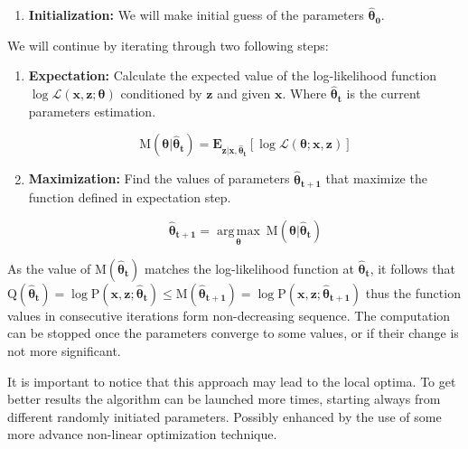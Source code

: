 \documentclass[thesis=M,english]{FITthesis}[2012/10/20]
\newcommand{\matr}[1]{\mathbf{#1}}
\begin{document}
\begin{enumerate}
\item \textbf{Initialization:} We will make initial guess of the parameters $\matr{ \boldsymbol{\hat \theta_{0} }} $.
\end{enumerate} 

We will continue by iterating through two following steps: 

\begin{enumerate}[resume]
\item \textbf{Expectation:} Calculate the expected value of the log-likelihood function $\log\mathcal{L}(\mathbf{x},\mathbf{z}; \boldsymbol{\theta})$ conditioned by $\matr{z}$ and given $\matr{x}$. Where ${\matr{\hat \theta_{t}}}$ is the current parameters estimation.

\begin{equation}\label{eq:exp}
 \mathrm{M}(\boldsymbol\theta|\boldsymbol{ \hat \theta_{t} }) = \mathbf{E}_{\matr{z}|\matr{x},\boldsymbol{ \hat \theta_{t}}}\left[ \log \mathcal{L} (\boldsymbol\theta;\matr{x},\matr{z})  \right]
\end{equation}

\item \textbf{Maximization:} Find the values of parameters $ \boldsymbol{\hat \theta_{t+1}}$ that maximize the function defined in expectation step. 

\begin{equation}
\boldsymbol{ \hat \theta_{t+1} } = \underset{\boldsymbol\theta}{\operatorname{arg\,max}} \ \mathrm{M}(\boldsymbol\theta|\boldsymbol{ \hat \theta_{t} })
\end{equation}
\end{enumerate}  

As the value of $\mathrm{M}( \boldsymbol{ \hat \theta_{t} } )$ matches the log-likelihood function at 
$ {\boldsymbol{ \hat \theta_{t}}}$, it follows that 
$ \mathrm{Q}( \boldsymbol{\hat \theta_{t}}) =  \log \mathrm{P}(\mathbf{x},\mathbf{z}; \boldsymbol{\hat \theta_{t}}) \leq \mathrm{M}( \boldsymbol{  \hat \theta_{t+1}}) =  \log \mathrm{P}(\mathbf{x},\mathbf{z}; \boldsymbol{\hat \theta_{t+1}})$ 
thus the function values in consecutive iterations form non-decreasing sequence. The computation can be stopped once the parameters converge to some values, or if their change is not more significant.  

It is important to notice that this approach may lead to the local optima. To get better results the algorithm can be launched more times, starting always from different randomly initiated parameters. Possibly enhanced by the use of some more advance non-linear optimization technique.
\end{document}
